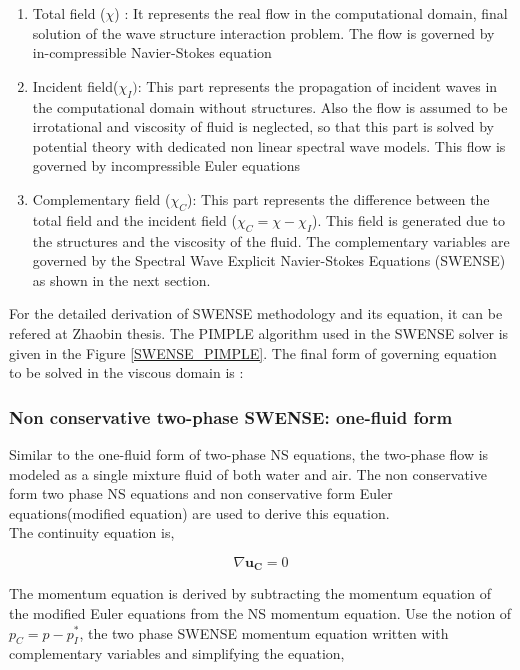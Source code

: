 \documentclass[preprint,12pt]{article}
\begin{document}
{\begin{enumerate}
\item Total field ($\chi$) : It represents the real flow in the computational domain, final solution of the wave structure interaction problem. The flow is governed by in-compressible Navier-Stokes equation
\item Incident field($\chi_I)$:  This part represents the propagation of incident waves in the computational domain without structures. Also the flow is assumed to be irrotational and viscosity of fluid is neglected, so that this part is solved by potential theory with dedicated non linear spectral wave models. This flow is governed by incompressible Euler equations
\item Complementary field ($\chi_C$): This part represents the difference between the total field and the incident field ($\chi_C=\chi-\chi_I$). This field is generated due to the structures and the viscosity of the fluid. The complementary variables are governed by the Spectral Wave Explicit Navier-Stokes Equations (SWENSE) as shown in the next section.  
\end{enumerate}


For the detailed derivation of SWENSE methodology and its equation, it can be refered at Zhaobin thesis\cite{zhaobin_progress}. The PIMPLE algorithm used in the SWENSE solver is given in the Figure \ref{SWENSE_PIMPLE}. The final form of governing equation to be solved in the viscous domain is : 

\subsubsection*{Non conservative two-phase SWENSE: one-fluid form}
Similar to the one-fluid form of two-phase NS equations, the two-phase flow is modeled as a single mixture fluid of both water and air. The non conservative form two phase NS equations and non conservative form Euler equations(modified equation) are used to derive this equation. \\
The continuity equation is, 

\begin{equation}
\nabla \pmb{u_C}=0
\end{equation}

The momentum equation is derived by subtracting the momentum equation of the modified Euler equations from the NS momentum equation. Use the notion of $p_C=p-p_I^*$, the two phase SWENSE momentum equation written with complementary variables and simplifying the equation,

}
\end{document}
